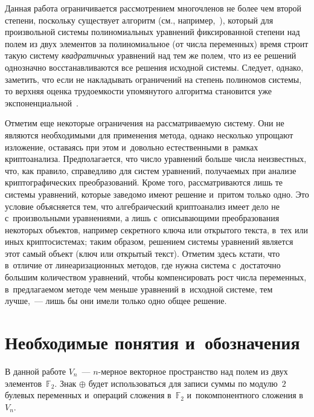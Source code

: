 \begin{multicols}{2}
Данная работа ограничивается рассмотрением многочленов не более чем второй 
степени, поскольку существует алгоритм (см., например,~\cite[\S{}.2]{Bard2009}), 
который для произвольной системы полиномиальных 
уравнений фиксированной степени над полем из двух элементов за полиномиальное 
(от числа переменных) время
строит такую систему \textit{квадратичных} уравнений над тем же полем, что из ее 
решений однозначно восстанавливаются все решения исходной системы.
Следует, однако, заметить, что если не накладывать ограничений на степень 
полиномов системы, то верхняя оценка трудоемкости упомянутого алгоритма 
становится уже экспоненциальной~\cite[\S{}.6]{Bard2009}. 

Отметим еще некоторые ограничения на рассматриваемую систему. Они не являются 
необходимыми для применения метода, однако несколько упрощают изложение, 
оставаясь при этом и~довольно естественными в~рамках криптоанализа.
Предполагается, что число уравнений больше чис\-ла неизвестных, что, как правило, 
справедливо для сис\-тем уравнений, получаемых при анализе крип\-то\-гра\-фи\-че\-ских 
преобразований.
Кроме того, рас\-смат\-ри\-ва\-ют\-ся лишь те системы уравнений, которые заведомо имеют 
решение и~притом только одно.
Это условие объясняется тем, что алгебраический крип\-то\-ана\-лиз имеет дело не 
с~произвольными уравнениями, а лишь с~описывающими преобразования некоторых 
объектов, например секретного ключа или открытого текста, в~тех или иных 
криптосистемах; таким образом, решением системы уравнений является этот самый 
объект (ключ или открытый текст).
Отметим здесь кстати, что в~отличие от линеаризационных методов, где нужна 
система с~достаточно большим количеством уравнений, чтобы компенсировать рост 
числа переменных, в~предлагаемом методе чем меньше уравнений в~исходной системе, 
тем лучше,~--- лишь бы они имели только одно общее решение.


\section{Необходимые понятия и~обозначения}

В данной работе $V_n$~--- $n$-мер\-ное векторное пространство над полем из двух 
элементов~$\mathbb{F}_2$.
Знак $\oplus$ будет использоваться для записи суммы по модулю~$2$ булевых 
переменных и~операций сложения в~$\mathbb{F}_2$ и~покомпонентного сложения 
в~$V_n$.


\end{multicols}
